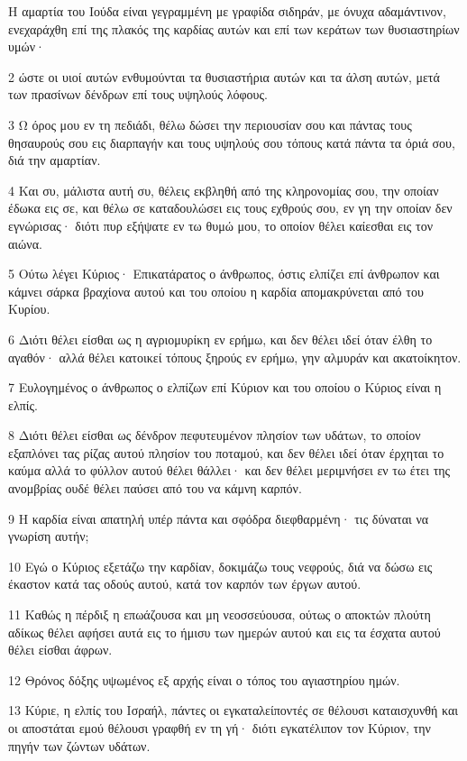 \par Η αμαρτία του Ιούδα είναι γεγραμμένη με γραφίδα σιδηράν, με όνυχα αδαμάντινον, ενεχαράχθη επί της πλακός της καρδίας αυτών και επί των κεράτων των θυσιαστηρίων υμών·
\par 2 ώστε οι υιοί αυτών ενθυμούνται τα θυσιαστήρια αυτών και τα άλση αυτών, μετά των πρασίνων δένδρων επί τους υψηλούς λόφους.
\par 3 Ω όρος μου εν τη πεδιάδι, θέλω δώσει την περιουσίαν σου και πάντας τους θησαυρούς σου εις διαρπαγήν και τους υψηλούς σου τόπους κατά πάντα τα όριά σου, διά την αμαρτίαν.
\par 4 Και συ, μάλιστα αυτή συ, θέλεις εκβληθή από της κληρονομίας σου, την οποίαν έδωκα εις σε, και θέλω σε καταδουλώσει εις τους εχθρούς σου, εν γη την οποίαν δεν εγνώρισας· διότι πυρ εξήψατε εν τω θυμώ μου, το οποίον θέλει καίεσθαι εις τον αιώνα.
\par 5 Ούτω λέγει Κύριος· Επικατάρατος ο άνθρωπος, όστις ελπίζει επί άνθρωπον και κάμνει σάρκα βραχίονα αυτού και του οποίου η καρδία απομακρύνεται από του Κυρίου.
\par 6 Διότι θέλει είσθαι ως η αγριομυρίκη εν ερήμω, και δεν θέλει ιδεί όταν έλθη το αγαθόν· αλλά θέλει κατοικεί τόπους ξηρούς εν ερήμω, γην αλμυράν και ακατοίκητον.
\par 7 Ευλογημένος ο άνθρωπος ο ελπίζων επί Κύριον και του οποίου ο Κύριος είναι η ελπίς.
\par 8 Διότι θέλει είσθαι ως δένδρον πεφυτευμένον πλησίον των υδάτων, το οποίον εξαπλόνει τας ρίζας αυτού πλησίον του ποταμού, και δεν θέλει ιδεί όταν έρχηται το καύμα αλλά το φύλλον αυτού θέλει θάλλει· και δεν θέλει μεριμνήσει εν τω έτει της ανομβρίας ουδέ θέλει παύσει από του να κάμνη καρπόν.
\par 9 Η καρδία είναι απατηλή υπέρ πάντα και σφόδρα διεφθαρμένη· τις δύναται να γνωρίση αυτήν;
\par 10 Εγώ ο Κύριος εξετάζω την καρδίαν, δοκιμάζω τους νεφρούς, διά να δώσω εις έκαστον κατά τας οδούς αυτού, κατά τον καρπόν των έργων αυτού.
\par 11 Καθώς η πέρδιξ η επωάζουσα και μη νεοσσεύουσα, ούτως ο αποκτών πλούτη αδίκως θέλει αφήσει αυτά εις το ήμισυ των ημερών αυτού και εις τα έσχατα αυτού θέλει είσθαι άφρων.
\par 12 Θρόνος δόξης υψωμένος εξ αρχής είναι ο τόπος του αγιαστηρίου ημών.
\par 13 Κύριε, η ελπίς του Ισραήλ, πάντες οι εγκαταλείποντές σε θέλουσι καταισχυνθή και οι αποστάται εμού θέλουσι γραφθή εν τη γή· διότι εγκατέλιπον τον Κύριον, την πηγήν των ζώντων υδάτων.
